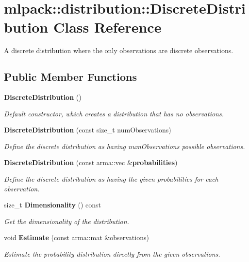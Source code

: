 \section{mlpack\-:\-:distribution\-:\-:Discrete\-Distribution Class Reference}
\label{classmlpack_1_1distribution_1_1DiscreteDistribution}


A discrete distribution where the only observations are discrete observations.  


\subsection*{Public Member Functions}
\begin{DoxyCompactItemize}
\item 
{\bf Discrete\-Distribution} ()
\begin{DoxyCompactList}\small\item\em Default constructor, which creates a distribution that has no observations. \end{DoxyCompactList}\item 
{\bf Discrete\-Distribution} (const size\-\_\-t num\-Observations)
\begin{DoxyCompactList}\small\item\em Define the discrete distribution as having num\-Observations possible observations. \end{DoxyCompactList}\item 
{\bf Discrete\-Distribution} (const arma\-::vec \&{\bf probabilities})
\begin{DoxyCompactList}\small\item\em Define the discrete distribution as having the given probabilities for each observation. \end{DoxyCompactList}\item 
size\-\_\-t {\bf Dimensionality} () const 
\begin{DoxyCompactList}\small\item\em Get the dimensionality of the distribution. \end{DoxyCompactList}\item 
void {\bf Estimate} (const arma\-::mat \&observations)
\begin{DoxyCompactList}\small\item\em Estimate the probability distribution directly from the given observations. \end{DoxyCompactList}\item 

\end{DoxyCompactItemize}
